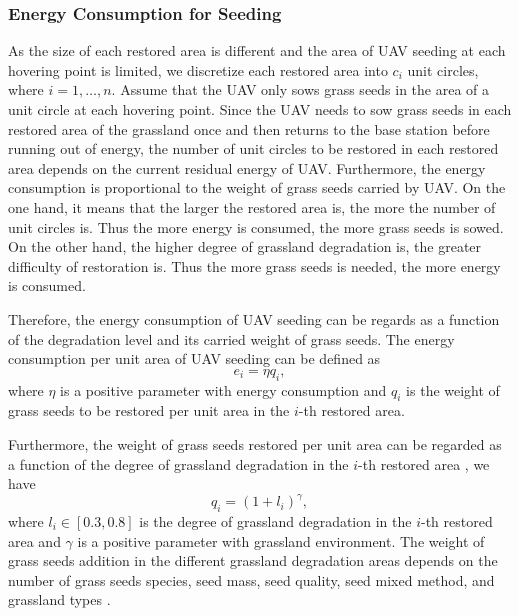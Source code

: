 \documentclass[preprint,5pt]{elsarticle}
\begin{document}
\subsubsection{Energy Consumption for Seeding}
As the size of each restored area is different and the area of UAV seeding at each hovering point is limited, we discretize each restored area into $c_i$ unit circles, where $i = 1,\ldots, n$.
Assume that the UAV only sows grass seeds in the area of a unit circle at each hovering point. Since the UAV needs to sow grass seeds in each restored area of the grassland once and then returns to the base station before running out of energy, the number of unit circles to be restored in each restored area depends on the current residual energy of UAV. Furthermore, the energy consumption is proportional to the weight of grass seeds carried by UAV. On the one hand, it means that the larger the restored area is, the more the number of unit circles is. Thus the more energy is consumed, the more grass seeds is sowed. On the other hand, the higher degree of grassland degradation is, the greater difficulty of restoration is. Thus the more grass seeds is needed, the more energy is consumed.

Therefore, the energy consumption of UAV seeding can be regards as a function of  the degradation level and its carried weight of grass seeds. The energy consumption per unit area of UAV seeding can be defined as
\begin{equation} \label{per-unit-area-seeding-energy}
e_i = \eta q_i,
\end{equation}
where $\eta$ is a positive parameter with energy consumption and $q_i$ is the weight of grass seeds to be restored per unit area in the $i$-th restored area.

Furthermore, the weight of grass seeds restored per unit area can be regarded as a function of the degree of grassland degradation in the $i$-th restored area \cite{klaus2017enriching}, we have
\begin{equation} \label{per-unit-area-seeding}
q_i = (1+l_i)^\gamma,
\end{equation}
where $l_i \in [0.3,0.8]$ is the degree of grassland degradation in the $i$-th restored area and $\gamma$ is a positive parameter with grassland environment. The weight of grass seeds addition in the different grassland degradation areas depends on the number of grass seeds species, seed mass, seed quality, seed mixed method, and grassland types \cite{bai2020long,freitag2021restoration,resch2022long}.
\end{document}

